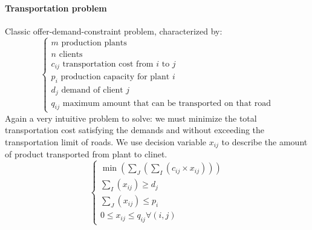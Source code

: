 \documentclass{article}
\begin{document}
			\paragraph{Transportation problem}
				Classic offer-demand-constraint problem, characterized by:
				\begin{equation}
					\begin{cases}
						m \text{ production plants} \\
						n \text{ clients} \\
						c_{ij} \text{ transportation cost from } i \text{ to } j \\
						p_i \text{ production capacity for plant } i \\
						d_j \text{ demand of client } j \\
						q_{ij} \text{ maximum amount that can be transported on that road}
					\end{cases}
				\end{equation}
				Again a very intuitive problem to solve: we must minimize the total transportation cost satisfying the demands and without exceeding the transportation limit of roads. We use decision variable $x_{ij}$ to describe the amount of product transported from plant to clinet.
				\begin{equation}
					\begin{cases}
						\min(\sum_J ( \sum_I (c_{ij} \times x_{ij}))) \\
						\sum_I (x_{ij}) \geq d_j \\
						\sum_J (x_{ij}) \leq p_i \\
						0 \leq x_{ij} \leq q_{ij} \forall (i, j)
					\end{cases}
				\end{equation}
\end{document}
